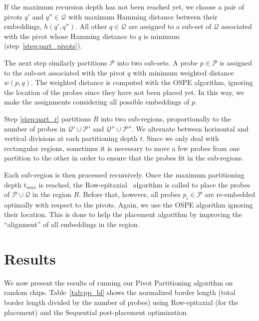 \documentclass{llncs}
\begin{document}
If the maximum recursion depth has not been reached yet, we choose a pair of
pivots $q'$ and $q'' \in \mathcal{Q}$ with maximum Hamming distance
between their embeddings, $h(q',q'')$. All other $q \in \mathcal{Q}$ are
assigned to a sub-set of $\mathcal{Q}$ associated with the pivot whose
Hamming distance to $q$ is minimum (step~\ref{step:part_pivots}).

The next step similarly partitions $\mathcal{P}$ into two sub-sets. A probe
$p \in \mathcal{P}$ is assigned to the sub-set associated with the pivot $q$
with minimum weighted distance $w(p,q)$. The weighted distance is computed
with the OSPE algorithm, ignoring the location of the probes since they have
not been placed yet. In this way, we make the assignments considering all
possible embeddings of $p$.

Step \ref{step:part_r} partitions $R$ into two sub-regions, proportionally to the
number of probes in $\mathcal{Q}' \cup \mathcal{P}'$ and $\mathcal{Q}'' \cup \mathcal{P}''$.
We alternate between horizontal and vertical divisions at each partitioning depth $t$.
Since we only deal with rectangular regions, sometimes it is necessary to move
a few probes from one partition to the other in order to ensure that the probes
fit in the sub-regions.

Each sub-region is then processed recursively. Once the maximum partitioning depth
$t_{max}$ is reached, the Row-epitaxial~\cite{KAHNG03A} algorithm is
called to place the probes of $\mathcal{P} \cup \mathcal{Q}$ in the region $R$.
Before that, however, all probes $p_i \in \mathcal{P}$ are re-embedded optimally
with respect to the pivots. Again, we use the OSPE algorithm ignoring their location.
This is done to help the placement algorithm by improving the ``alignment'' of all
embeddings in the region.

\section{Results}
\label{sec:results}

We now present the results of running our Pivot Partitioning algorithm on
random chips. Table~\ref{tab:pp_bl} shows the normalized border length (total border
length divided by the number of probes) using Row-epitaxial (for the placement) and
the Sequential post-placement optimization.
\end{document}
